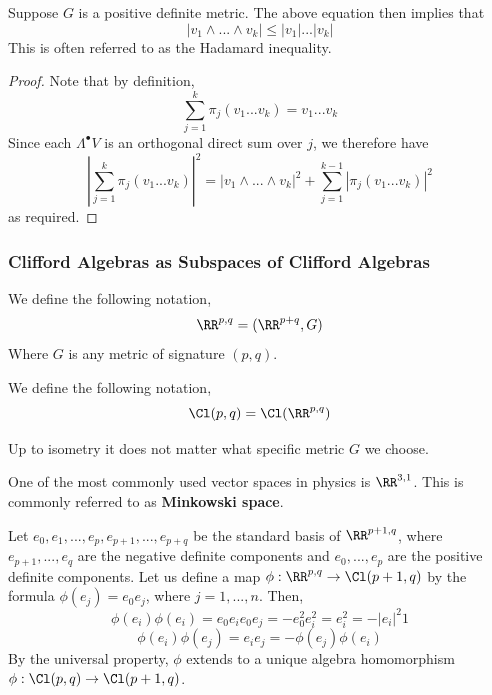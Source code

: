 \begin{cor}
Suppose $G$ is a positive definite metric.
    The above equation then implies that
    \begin{equation}
        |v_1\wedge...\wedge v_k|\leq |v_1|...|v_k|
    \end{equation}
    This is often referred to as the Hadamard inequality.
\end{cor}
\begin{proof}
    Note that by definition,
    \[\sum_{j=1}^{k}\pi_j(v_1...v_k) = v_1...v_k\]
    Since each $\Lambda^\bullet V$ is an orthogonal direct sum over $j$, we therefore have
    \[\left|\sum_{j=1}^{k}\pi_j(v_1...v_k)\right|^2  = |v_1\wedge...\wedge v_k|^2 + \sum_{j=1}^{k-1}|\pi_j(v_1...v_k)|^2\]
    as required.
\end{proof}
\subsubsection{Clifford Algebras as Subspaces of Clifford Algebras}
\begin{defn}
    We define the following notation,
    \[\RR^{p,q} = (\RR^{p+q},G)\]
    Where $G$ is any metric of signature $(p,q)$.
\end{defn}
\begin{defn}
    We define the following notation,
    \[\Cl(p,q) = \Cl(\RR^{p,q})\]
\end{defn}
\begin{remark*}
    Up to isometry it does not matter what specific metric $G$ we choose.
\end{remark*}
\begin{physics*}
    One of the most commonly used vector spaces in physics is $\RR^{3,1}$. This is commonly referred to as \textbf{Minkowski space}.
\end{physics*}

Let $e_0,e_1,...,e_p,e_{p+1},...,e_{p+q}$ be the standard basis of $\RR^{p+1,q}$, where $e_{p+1},...,e_q$ are the negative definite components and $e_0,...,e_p$ are the positive definite components. Let us define a map $\phi : \RR^{p,q} \to \Cl(p+1,q)$ by the formula $\phi(e_j) = e_0e_j$, where $j=1,...,n$. Then,
\[\phi(e_i)\phi(e_i) = e_0e_ie_0e_j = -e_0^2 e_i^2 = e_i^2 = -|e_i|^2 1\]
\[\phi(e_i)\phi(e_j) = e_ie_j = -\phi(e_j)\phi(e_i)\]
By the universal property, $\phi$ extends to a unique algebra homomorphism $\phi : \Cl(p,q) \to \Cl(p+1,q)$.

